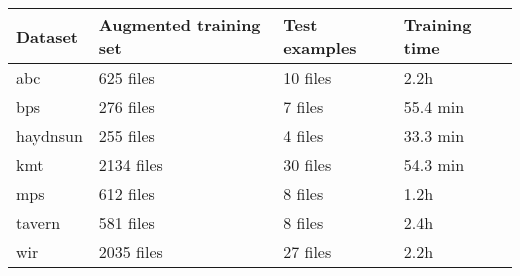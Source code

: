\begin{tabular}{l|lll}
Dataset        & Augmented training set & Test examples & Training time \\ \hline
\gls{abc}      & 625   files                 & 10 files            & 2.2h          \\
\gls{bps}      & 276   files                 & 7  files            & 55.4 min      \\
\gls{haydnsun} & 255   files                 & 4  files            & 33.3 min      \\
\gls{kmt}      & 2134  files                 & 30 files            & 54.3 min      \\
\gls{mps}      & 612   files                 & 8  files            & 1.2h          \\
\gls{tavern}   & 581   files                 & 8  files            & 2.4h          \\
\gls{wir}      & 2035  files                 & 27 files            & 2.2h         
\end{tabular}
